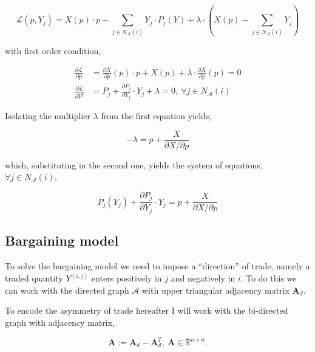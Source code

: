 \documentclass[american]{scrartcl}
\newcommand{\R}{\mathbb{R}}
\newcommand{\matr}[1]{\bm{#1}}
\begin{document}
\begin{equation}
	\mathcal{L}\left(p, Y_j\right) = X(p) \cdot p - \sum_{j \in N_{\mathcal{A}}(i)} Y_j \cdot P_j (Y) + \lambda\cdot \left(X(p) - \sum_{j \in N_{\mathcal{A}}(i)} Y_j\right)
\end{equation}

with first order condition,

\begin{equation}
	\begin{split}
		\frac{\partial \mathcal{L}}{\partial p}  &= \frac{\partial X}{\partial p}(p) \cdot p + X(p) + \lambda \cdot \frac{\partial X}{\partial p}(p) = 0 \\
		\frac{\partial \mathcal{L}}{\partial Y^j}  &= P_j + \frac{\partial P_j}{\partial Y_j} \cdot Y_j + \lambda =0, \ \forall j \in N_{\mathcal{A}}(i)
	\end{split}
\end{equation}

Isolating the multiplier $\lambda$ from the first equation yields,

\begin{equation}
	- \lambda = p + \frac{X}{\partial X / \partial p}
\end{equation}

which, substituting in the second one, yields the system of equations, $\forall j \in N_{\mathcal{A}}(i)$,

\begin{equation} \label{firm_optimization}
	P_j(Y_j) + \frac{\partial P_j}{\partial Y_j} \cdot Y_j = p + \frac{X}{\partial X / \partial p}
\end{equation}

\subsection{Bargaining model}

To solve the bargaining model we need to impose a ``direction'' of trade, namely a traded quantity $Y^{(i, j)}$ enters positively in $j$ and negatively in $i$. To do this we can work with the directed graph $\mathcal{A}$ with upper triangular adjacency matrix $\matr{A}_{d}$.

To encode the asymmetry of trade hereafter I will work with the bi-directed graph with adjacency matrix,

\begin{equation}
	\matr{A} := \matr{A}_{d} - \matr{A}_{d}^T,  \ \matr{A} \in\R^{n\times n}.
\end{equation}
\end{document}

